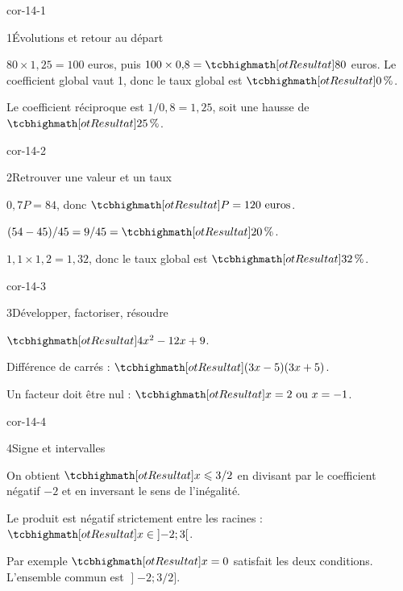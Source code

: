 \corrigesSouples

\begin{blocLivre}{cor-14-1}
\begin{corrige}{1}{Évolutions et retour au départ}
\begin{questions}
\item $80\times1{,}25=100$ euros, puis $100\times0{,}8=\res{80}$ euros. Le coefficient global vaut 1, donc le taux global est $\res{0\,\%}$.
\item Le coefficient réciproque est $1/0{,}8=1{,}25$, soit une hausse de $\res{25\,\%}$.
\end{questions}
\end{corrige}
\end{blocLivre}
\begin{blocLivre}{cor-14-2}
\begin{corrige}{2}{Retrouver une valeur et un taux}
\begin{questions}
\item $0{,}7P=84$, donc $\res{P=120\text{ euros}}$.
\item $(54-45)/45=9/45=\res{20\,\%}$.
\item $1{,}1\times1{,}2=1{,}32$, donc le taux global est $\res{32\,\%}$.
\end{questions}
\end{corrige}
\end{blocLivre}
\begin{blocLivre}{cor-14-3}
\begin{corrige}{3}{Développer, factoriser, résoudre}
\begin{questions}
\item $\res{4x^2-12x+9}$.
\item Différence de carrés : $\res{(3x-5)(3x+5)}$.
\item Un facteur doit être nul : $\res{x=2\text{ ou }x=-1}$.
\end{questions}
\end{corrige}
\end{blocLivre}
\begin{blocLivre}{cor-14-4}
\begin{corrige}{4}{Signe et intervalles}
\begin{questions}
\item On obtient $\res{x\leq3/2}$ en divisant par le coefficient négatif $-2$ et en inversant le sens de l’inégalité.
\item Le produit est négatif strictement entre les racines : $\res{x\in\mathopen{]}-2;3[}$.
\item Par exemple $\res{x=0}$ satisfait les deux conditions. L’ensemble commun est $\mathopen{]}-2;3/2]$.
\end{questions}
\end{corrige}
\end{blocLivre}
